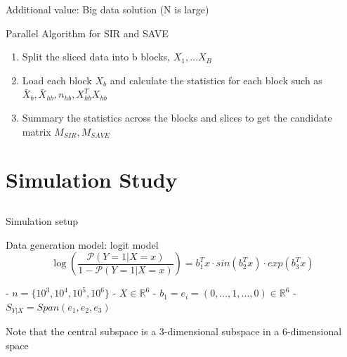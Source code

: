 \documentclass[ignorenonframetext,]{beamer}
\providecommand{\tightlist}{%
  \setlength{\itemsep}{0pt}\setlength{\parskip}{0pt}}
\begin{document}
\begin{frame}{Additional value: Big data solution (N is large)}

\begin{block}{Parallel Algorithm for SIR and SAVE}

\begin{enumerate}
\def\labelenumi{\arabic{enumi}.}
\tightlist
\item
  Split the sliced data into b blocks, \(X_1, \dots X_B\)\\
\item
  Load each block \(X_b\) and calculate the statistics for each block
  such as \(\bar{X}_b, \bar{X}_{hb}, n_{hb}, X^T_{hb}X_{hb}\)\\
\item
  Summary the statistics across the blocks and slices to get the
  candidate matrix \(M_{SIR}, M_{SAVE}\)
\end{enumerate}

\end{block}

\end{frame}

\section{Simulation Study}\label{simulation-study}

\subsection{}\label{section}

\begin{frame}{Simulation setup}

\begin{block}{Data generation model: logit model}
\[
    \log\left(\frac{\mathcal{P}(Y=1|X=x)}{1-\mathcal{P}(Y=1|X=x)}\right) = b_1^Tx \cdot sin(b_2^Tx) \cdot exp(b_3^Tx)
\]

- $n = \{10^3, 10^4, 10^5,10^6\}$  
- $X \in \mathbb{R}^6$  
- $b_1 = e_i = (0, \dots, 1, \dots,0) \in \mathbb{R}^6$  
- $S_{Y|X} = Span(e_1, e_2, e_3)$  
\end{block}

Note that the central subspace is a 3-dimensional subspace in a
6-dimensional space

\end{frame}
\end{document}
